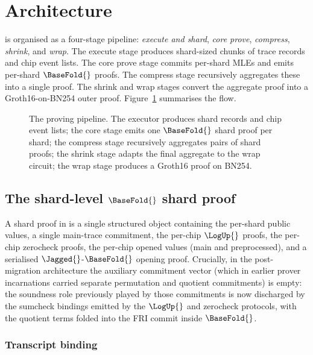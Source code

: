 \section{Architecture}
\label{sec:architecture}

\Zirenver{} is organised as a four-stage pipeline: \emph{execute and shard}, \emph{core prove}, \emph{compress}, \emph{shrink}, and \emph{wrap}. The execute stage produces shard-sized chunks of trace records and chip event lists. The core prove stage commits per-shard MLEs and emits per-shard $\BaseFold{}$ proofs. The compress stage recursively aggregates these into a single proof. The shrink and wrap stages convert the aggregate proof into a Groth16-on-BN254 outer proof. Figure~\ref{fig:pipeline} summarises the flow.

\begin{figure}[t]
\centering

\caption{The \Zirenver{} proving pipeline. The executor produces shard records and chip event lists; the core stage emits one $\BaseFold{}$ shard proof per shard; the compress stage recursively aggregates pairs of shard proofs; the shrink stage adapts the final aggregate to the wrap circuit; the wrap stage produces a Groth16 proof on BN254.}
\label{fig:pipeline}
\end{figure}

\subsection{The shard-level $\BaseFold{}$ shard proof}

A shard proof in \Zirenver{} is a single structured object containing the per-shard public values, a single main-trace commitment, the per-chip $\LogUp{}$ proofs, the per-chip zerocheck proofs, the per-chip opened values (main and preprocessed), and a serialised $\Jagged{}$-$\BaseFold{}$ opening proof. Crucially, in the post-migration architecture the auxiliary commitment vector (which in earlier prover incarnations carried separate permutation and quotient commitments) is empty: the soundness role previously played by those commitments is now discharged by the sumcheck bindings emitted by the $\LogUp{}$ and zerocheck protocols, with the quotient terms folded into the FRI commit inside $\BaseFold{}$.

\subsubsection{Transcript binding}

